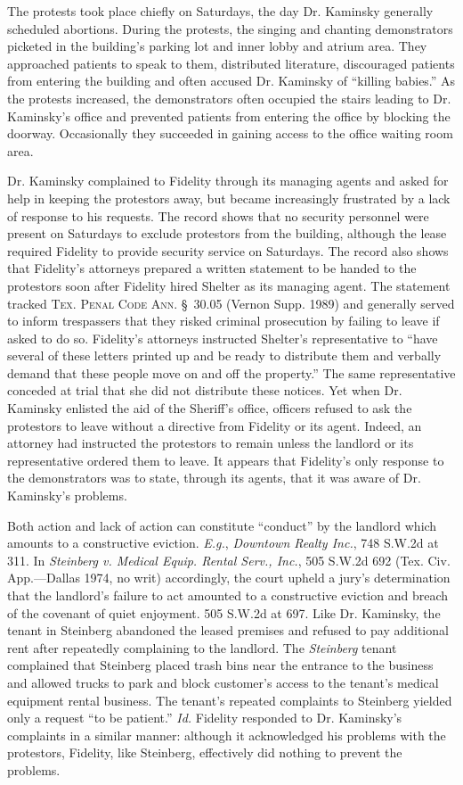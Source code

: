 The protests took place chiefly on Saturdays, the day Dr. Kaminsky generally
scheduled abortions. During the protests, the singing and chanting
demonstrators picketed in the building's parking lot and inner lobby and atrium
area. They approached patients to speak to them, distributed literature,
discouraged patients from entering the building and often accused Dr. Kaminsky
of ``killing babies.'' As the protests increased, the demonstrators often
occupied the stairs leading to Dr. Kaminsky's office and prevented patients
from entering the office by blocking the doorway. Occasionally they succeeded
in gaining access to the office waiting room area.

Dr. Kaminsky complained to Fidelity through its managing agents and asked for
help in keeping the protestors away, but became increasingly frustrated by a
lack of response to his requests. The record shows that no security personnel
were present on Saturdays to exclude protestors from the building, although the
lease required Fidelity to provide security service on Saturdays. The record
also shows that Fidelity's attorneys prepared a written statement to be handed
to the protestors soon after Fidelity hired Shelter as its managing agent. The
statement tracked \textsc{Tex. Penal Code Ann.} \S~30.05 (Vernon Supp. 1989) and
generally served to inform trespassers that they risked criminal prosecution by
failing to leave if asked to do so. Fidelity's attorneys instructed Shelter's
representative to ``have several of these letters printed up and be ready to
distribute them and verbally demand that these people move on and off the
property.'' The same representative conceded at trial that she did not
distribute these notices. Yet when Dr. Kaminsky enlisted the aid of the
Sheriff's office, officers refused to ask the protestors to leave without a
directive from Fidelity or its agent. Indeed, an attorney had instructed the
protestors to remain unless the landlord or its representative ordered them to
leave. It appears that Fidelity's only response to the demonstrators was to
state, through its agents, that it was aware of Dr. Kaminsky's problems.

Both action and lack of action can constitute ``conduct'' by the landlord which
amounts to a constructive eviction. \textit{E.g.}, \textit{Downtown Realty
Inc.}, 748 S.W.2d at 311. In \textit{Steinberg v. Medical Equip. Rental Serv.,
Inc.}, 505 S.W.2d 692 (Tex. Civ. App.---Dallas 1974, no writ) accordingly, the
court upheld a jury's determination that the landlord's failure to act amounted
to a constructive eviction and breach of the covenant of quiet enjoyment. 505
S.W.2d at 697. Like Dr. Kaminsky, the tenant in Steinberg abandoned the leased
premises and refused to pay additional rent after repeatedly complaining to the
landlord. The \textit{Steinberg} tenant complained that Steinberg placed trash
bins near the entrance to the business and allowed trucks to park and block
customer's access to the tenant's medical equipment rental business. The
tenant's repeated complaints to Steinberg yielded only a request ``to be
patient.'' \emph{Id.} Fidelity responded to Dr. Kaminsky's complaints in a
similar
manner: although it acknowledged his problems with the protestors, Fidelity,
like Steinberg, effectively did nothing to prevent the problems.

